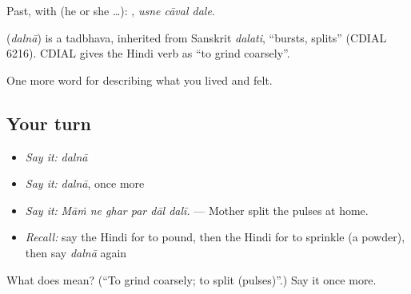 Past, with  (he or she …):   , \emph{usne cāval dale}.

\begin{cousinweb}
\textbf{} (\emph{dalnā}) is a tadbhava, inherited from Sanskrit \emph{dalati}, \textquotedblleft{}bursts, splits\textquotedblright{} (CDIAL 6216). CDIAL gives the Hindi verb as \textquotedblleft{}to grind coarsely\textquotedblright{}.
\end{cousinweb}

\begin{grammarlens}[title={What you've built}]
One more word for describing what you lived and felt.
\end{grammarlens}

\subsection*{Your turn}
\begin{itemize}
\raggedright
  \item \emph{Say it:} \emph{dalnā}
  \item \emph{Say it:} \emph{dalnā}, once more
  \item \emph{Say it:} \emph{Māṁ ne ghar par dāl dalī.} — Mother split the pulses at home.
  \item \emph{Recall:} say the Hindi for to pound, then the Hindi for to sprinkle (a powder), then say \emph{dalnā} again
\end{itemize}

\begin{tcolorbox}[breakable,colback=teal!4,colframe=teal!35!black,title={Before you move on}]
What does  mean? (\textquotedblleft{}To grind coarsely; to split (pulses)\textquotedblright{}.) Say it once more.
\end{tcolorbox}
